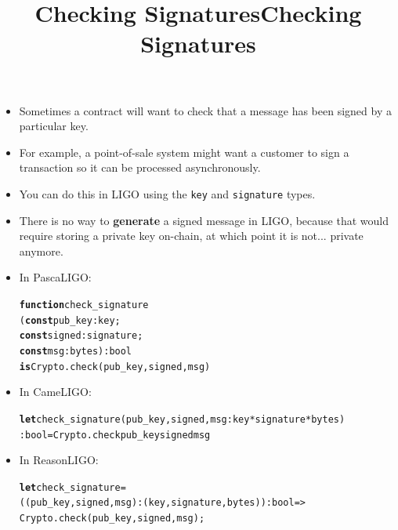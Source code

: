 \documentclass[wide]{slides}
\newcommand{\Kconst}[0]{\textbf{const}\xspace}
\newcommand{\Kfunction}[0]{\textbf{function}\xspace}
\newcommand{\Kis}[0]{\textbf{is}\xspace}
\newcommand{\Klet}[0]{\textbf{let}\xspace}
\begin{document}
\begin{slide}
  \title{Checking Signatures}

  \begin{itemize}

    \item Sometimes a contract will want to check that a message has
      been signed by a particular key.

    \item For example, a point-of-sale system might want a customer to
      sign a transaction so it can be processed asynchronously.

    \item You can do this in LIGO using the \texttt{key} and
      \texttt{signature} types.

    \item There is no way to \textbf{generate} a signed message in
      LIGO, because that would require storing a private key on-chain,
      at which point it is not... private anymore.

  \end{itemize}

\end{slide}

\begin{slide}
  \title{Checking Signatures}

  \begin{itemize}

    \item In PascaLIGO:
      \begin{alltt}
\Kfunction check_signature
    (\Kconst pub_key : key;
     \Kconst signed  : signature;
     \Kconst msg      : bytes) : bool
\Kis Crypto.check (pub_key, signed, msg)
      \end{alltt}

    \item In CameLIGO:
      \begin{alltt}
\Klet check_signature (pub_key, signed, msg : key * signature * bytes)
  : bool = Crypto.check pub_key signed msg
      \end{alltt}

    \item In ReasonLIGO:
      \begin{alltt}
\Klet check_signature =
  ((pub_key, signed, msg) : (key, signature, bytes)) : bool =>
  Crypto.check (pub_key, signed, msg);
      \end{alltt}

  \end{itemize}

\end{slide}
\end{document}

